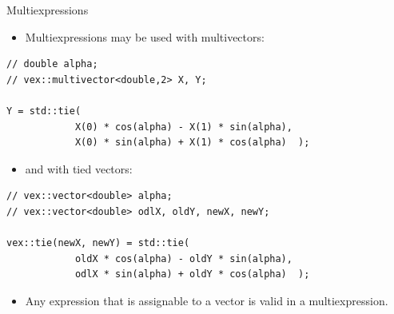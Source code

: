 \documentclass[@BEAMER_OPTIONS@]{beamer}
\begin{document}

\begin{frame}[fragile]{Multiexpressions}
    \begin{itemize}
        \item Multiexpressions may be used with multivectors:
    \end{itemize}
    \begin{exampleblock}{}
        \begin{lstlisting}
// double alpha;
// vex::multivector<double,2> X, Y;

Y = std::tie(
            X(0) * cos(alpha) - X(1) * sin(alpha),
            X(0) * sin(alpha) + X(1) * cos(alpha)  );
        \end{lstlisting}
    \end{exampleblock}
    \begin{itemize}
        \item and with tied vectors:
    \end{itemize}
    \begin{exampleblock}{}
        \begin{lstlisting}
// vex::vector<double> alpha;
// vex::vector<double> odlX, oldY, newX, newY;

vex::tie(newX, newY) = std::tie(
            oldX * cos(alpha) - oldY * sin(alpha),
            odlX * sin(alpha) + oldY * cos(alpha)  );
        \end{lstlisting}
    \end{exampleblock}
    \begin{itemize}
        \item Any expression that is assignable to a vector is valid in a
            multiexpression.
    \end{itemize}
\end{frame}

\end{document}
